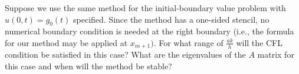 Suppose we use the same method for the initial-boundary value problem with $u(0, t) = g_0(t)$ specified. Since the 
method has a one-sided stencil, no numerical boundary condition is needed at the right boundary (i.e., the formula for
our method may be applied at $x_{m+1})$. For what range of $\frac{ak}{h}$ will the CFL condition be satisfied in this
case? What are the eigenvalues of the $A$ matrix for this case and when will the method be stable?

\begin{solution}\ \\\\
    \hfill\vfill
    \ \\
\end{solution}